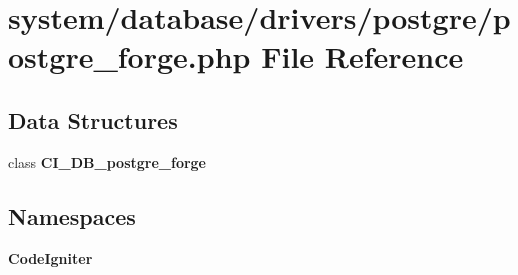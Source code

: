 \section{system/database/drivers/postgre/postgre\-\_\-forge.php File Reference}
\label{postgre__forge_8php}
\subsection*{Data Structures}
\begin{DoxyCompactItemize}
\item 
class {\bf C\-I\-\_\-\-D\-B\-\_\-postgre\-\_\-forge}
\end{DoxyCompactItemize}
\subsection*{Namespaces}
\begin{DoxyCompactItemize}
\item 
{\bf Code\-Igniter}
\end{DoxyCompactItemize}
